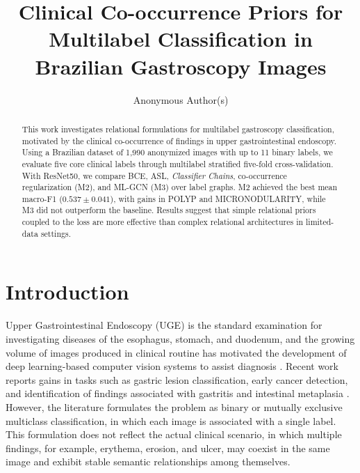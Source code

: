 \documentclass[12pt]{article}
\title{Clinical Co-occurrence Priors for Multilabel Classification in Brazilian Gastroscopy Images}
\author{Anonymous Author(s)}
\begin{document}
 

\maketitle

\begin{abstract}
This work investigates relational formulations for multilabel gastroscopy classification, motivated by the clinical co-occurrence of findings in upper gastrointestinal endoscopy. Using a Brazilian dataset of 1,990 anonymized images with up to 11 binary labels, we evaluate five core clinical labels through multilabel stratified five-fold cross-validation. With ResNet50, we compare BCE, ASL, \textit{Classifier Chains}, co-occurrence regularization (M2), and ML-GCN (M3) over label graphs. M2 achieved the best mean macro-F1 ($0.537 \pm 0.041$), with gains in POLYP and MICRONODULARITY, while M3 did not outperform the baseline. Results suggest that simple relational priors coupled to the loss are more effective than complex relational architectures in limited-data settings.
\end{abstract}

\section{Introduction}
\label{sec:Introduction}


Upper Gastrointestinal Endoscopy (UGE) is the standard examination for investigating diseases of the esophagus, stomach, and duodenum, and the growing volume of images produced in clinical routine has motivated the development of deep learning-based computer vision systems to assist diagnosis \cite{Klang2023}. Recent work reports gains in tasks such as gastric lesion classification, early cancer detection, and identification of findings associated with gastritis and intestinal metaplasia \cite{10078850,Yang20237}. However, the literature formulates the problem as binary or mutually exclusive multiclass classification, in which each image is associated with a single label. This formulation does not reflect the actual clinical scenario, in which multiple findings, for example, erythema, erosion, and ulcer, may coexist in the same image and exhibit stable semantic relationships among themselves.
\end{document}
